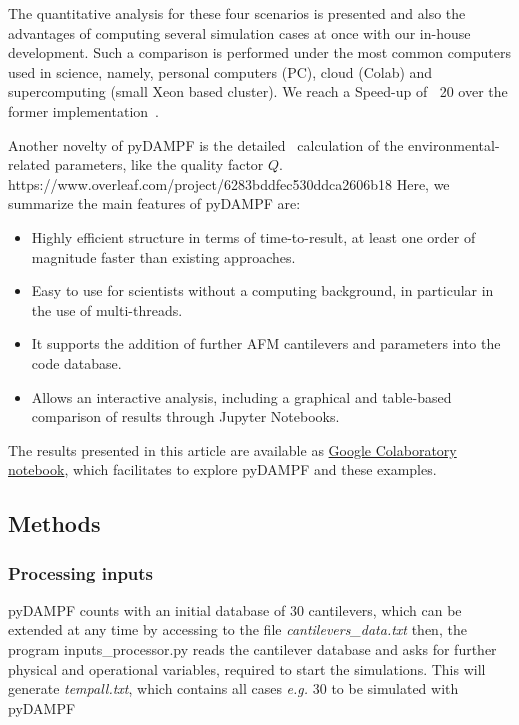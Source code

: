 \documentclass[letterpaper,compsoc,twoside]{IEEEtran}
\providecommand*{\DUrole}[2]{%
  \ifcsname DUrole#1\endcsname%
    \csname DUrole#1\endcsname{#2}%
  \else
    \ifcsname docutilsrole#1\endcsname%
      \PackageWarningNoLine{docutils}{Command prefix "docutilsrole" is
         deprecated, \MessageBreak use `\protect\DUrole #1`}
      \csname docutilsrole#1\endcsname{#2}%
    \else%
      #2%
    \fi%
  \fi%
}
\begin{document}
The quantitative analysis for these four scenarios is presented and also the advantages of computing several simulation cases at once with our in-house development. Such a comparison is performed under the most common computers used in science, namely, personal computers (PC), cloud (Colab) and supercomputing (small Xeon based cluster). We reach a Speed-up of $~$ 20 over the former implementation~\cite{dForce}.

Another novelty of pyDAMPF is the detailed~\cite{Sader} calculation of the environmental-related parameters, like the quality factor $Q$. 
https://www.overleaf.com/project/6283bddfec530ddca2606b18
Here, we summarize the main features of pyDAMPF are:
\begin{itemize}
\item 

Highly efficient structure in terms of time-to-result, at least one order of magnitude faster than existing approaches.
\item 
Easy to use for scientists without a computing background, in particular in the use of multi-threads.
\item
It supports the addition of further AFM cantilevers and parameters into the code database.
\item 

Allows an interactive analysis, including a graphical and table-based comparison of results through Jupyter Notebooks.
\end{itemize}



The results presented in this article are available as \href{https://colab.research.google.com/drive/1ZM_aQsuYWUD2gnhcIhngpypJ6m1MbFxE?usp=sharing}{Google
Colaboratory notebook}, which facilitates to explore pyDAMPF and these examples.

\subsection{Methods%
  \label{Methods}%
}

\subsubsection{Processing inputs%
  \label{inputs}%
}
pyDAMPF counts with an initial database of 30 cantilevers, which can be extended at any time by accessing to the file \textit{cantilevers\_data.txt} then, the program inputs\_processor.py  reads the cantilever database and asks for further physical and operational variables, required to start the simulations. This will generate \textit{tempall.txt}, which contains all cases \textit{e.g.} 30 to be simulated with pyDAMPF
\end{document}
